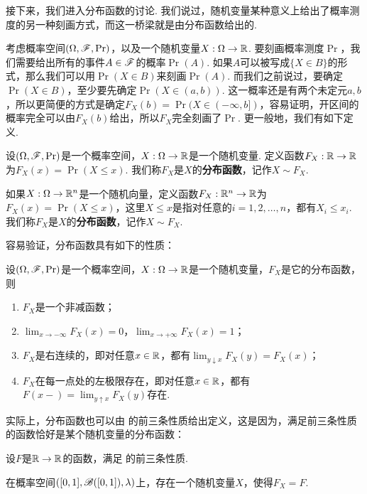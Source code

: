 接下来，我们进入分布函数的讨论. 我们说过，随机变量某种意义上给出了概率测度的另一种刻画方式，而这一桥梁就是由分布函数给出的. 

考虑概率空间$(\Omega,\mathscr{F},\Pr)$，以及一个随机变量$X:\Omega\to\mathbb{R}$. 要刻画概率测度$\Pr$，我们需要给出所有的事件$A\in\mathscr{F}$的概率$\Pr(A)$. 如果$A$可以被写成$\{X\in B\}$的形式，那么我们可以用$\Pr(X\in B)$来刻画$\Pr(A)$. 而我们之前说过，要确定$\Pr(X\in B)$，至少要先确定$\Pr(X\in(a,b))$. 这一概率还是有两个未定元$a,b$，所以更简便的方式是确定$F_X(b)=\Pr(X\in(-\infty,b])$，容易证明，开区间的概率完全可以由$F_X(b)$给出，所以$F_X$完全刻画了$\Pr$. 更一般地，我们有如下定义. 

\begin{definition}[分布函数]
设$(\Omega,\mathscr{F},\Pr)$是一个概率空间，$X:\Omega\to\mathbb{R}$是一个随机变量. 定义函数$F_X:\mathbb{R}\to\mathbb{R}$为$F_X(x) = \Pr(X\leq x)$. 我们称$F_X$是$X$的\textbf{分布函数}，记作$X\sim F_X$.

如果$X:\Omega\to\mathbb{R}^n$是一个随机向量，定义函数$F_X:\mathbb{R}^n\to\mathbb{R}$为$F_X(x) = \Pr(X\leq x)$，这里$X\leq x$是指对任意的$i=1,2,\ldots,n$，都有$X_i\leq x_i$. 我们称$F_X$是$X$的\textbf{分布函数}，记作$X\sim F_X$.
\end{definition}

容易验证，分布函数具有如下的性质：

\begin{proposition}\label{proposition:distribution-function}
设$(\Omega,\mathscr{F},\Pr)$是一个概率空间，$X:\Omega\to\mathbb{R}$是一个随机变量，$F_X$是它的分布函数，则
\begin{enumerate}
    \item $F_X$是一个非减函数；
    \item $\lim_{x\to-\infty}F_X(x)=0$，$\lim_{x\to+\infty}F_X(x)=1$；
    \item $F_X$是右连续的，即对任意$x\in\mathbb{R}$，都有$\lim_{y\downarrow x}F_X(y)=F_X(x)$；
    \item $F_X$在每一点处的左极限存在，即对任意$x\in\mathbb{R}$，都有$F(x-)=\lim_{y\uparrow x}F_X(y)$存在.
\end{enumerate}
\end{proposition}

实际上，分布函数也可以由 的前三条性质给出定义，这是因为，满足前三条性质的函数恰好是某个随机变量的分布函数：

\begin{theorem}\label{theorem:distribution-function}
设$F$是$\mathbb{R}\to\mathbb{R}$的函数，满足 的前三条性质. 

在概率空间$([0,1],\mathscr{B}([0,1]),\lambda)$上，存在一个随机变量$X$，使得$F_X=F$.
\end{theorem}

